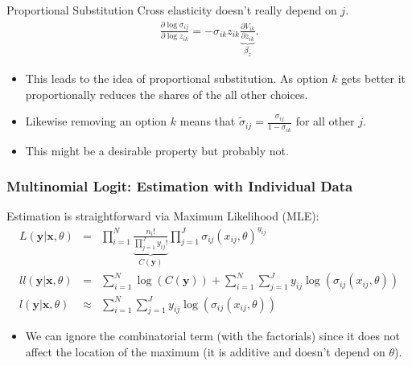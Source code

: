 \documentclass[aspectratio=169,11pt]{beamer}
\begin{document}
\begin{frame}{Proportional Substitution}
Cross elasticity doesn't really depend on $j$.
\begin{eqnarray*}
\frac{ \partial \log \sigma_{ij}}{ \partial \log z_{ik}} = -\sigma_{ik} z_{ik} \underbrace{\frac{\partial V_{ik}}{\partial z_{ik}}}_{\beta_z}.
\end{eqnarray*}
\begin{itemize}
\item This leads to the idea of proportional substitution. As option $k$ gets better it proportionally reduces the shares of the all other choices.
\item Likewise removing an option $k$ means that $\tilde{\sigma}_{ij} = \frac{\sigma_{ij}}{1-\sigma_{ik}}$ for all other $j$.
\item This might be a desirable property but probably not.
\end{itemize}
\end{frame}





\begin{frame}
\frametitle{Multinomial Logit: Estimation with Individual Data}
Estimation is straightforward via Maximum Likelihood (MLE):
\begin{eqnarray*}
L(\symbf{y} | \symbf{x}, \theta) &=& \prod_{i=1}^N  \underbrace{\frac{n_i!}{\prod_{j=1}^J y_{ij}!}}_{C(\symbf{y})} \prod_{j=1}^J  \sigma_{ij}(x_{ij},\theta)^{y_{ij}} \\
ll(\symbf{y} | \symbf{x}, \theta) &=& \sum_{i=1}^N \log(C(\symbf{y}))   + \sum_{i=1}^N \sum_{j=1}^J y_{ij} \log( \sigma_{ij}(x_{ij},\theta)) \\
l(\symbf{y} | \symbf{x}, \theta) &\approx& \sum_{i=1}^N \sum_{j=1}^J y_{ij} \log( \sigma_{ij}(x_{ij},\theta))
\end{eqnarray*}
\begin{itemize}
\item We can ignore the combinatorial term (with the factorials) since it does not affect the location of the maximum (it is additive and doesn't depend on $\theta$).
\end{itemize}
\end{frame}
\end{document}
